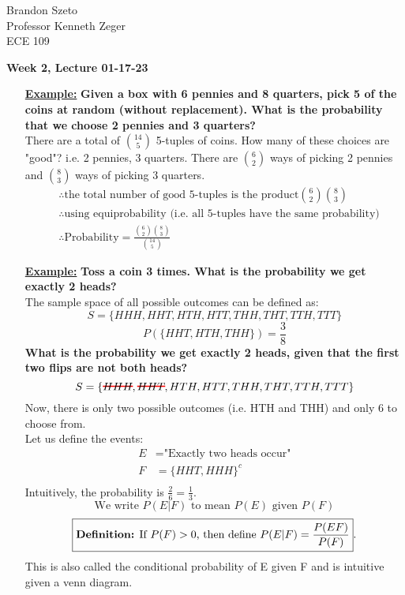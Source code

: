 \documentclass[10pt]{article}
\newcommand\hcancel[2][black]{\setbox0=\hbox{$#2$}%
\rlap{\raisebox{.45\ht0}{\textcolor{#1}{\rule{\wd0}{1pt}}}}#2}
\begin{document}
\begin{flushleft}
    Brandon Szeto \\
    Professor Kenneth Zeger \\
	ECE 109 \\
\end{flushleft}

\begin{center}
	\Large \textbf{Week 2, Lecture 01-17-23}
\end{center}
\normalsize

\begin{itemize}
    \item[\textbf{\underline{Example:}}] \textbf{Given a box with 6 pennies and 8 quarters, pick
        5 of the coins at random (without replacement). What is the probability
    that we choose 2 pennies and 3 quarters?} \\
    There are a total of $\binom{14}{5}$ 5-tuples of coins. How many of these
    choices are "good"? i.e. 2 pennies, 3 quarters. There are $\binom{6}{2}$
    ways of picking 2 pennies and $\binom{8}{3}$ ways of picking 3 quarters.
    $$\begin{aligned}
        &\therefore \text{the total number of good 5-tuples is the product} \binom{6}{2}
    \binom{8}{3} \\
        &\therefore \text{using equiprobability (i.e. all 5-tuples have the same
    probability)} \\
        &\therefore \text{Probability} = \frac{\binom{6}{2}\binom{8}{3}}{\binom{14}{5}}
\end{aligned}$$
    \item[\textbf{\underline{Example:}}] \textbf{Toss a coin 3 times. What is
        the probability we get exactly 2 heads?} \\
        The sample space of all possible outcomes can be defined as:
        $$ S = \{HHH, HHT, HTH, HTT, THH, THT, TTH, TTT\}$$
        $$ P(\{ HHT, HTH, THH \}) = \frac{3}{8}$$
        \textbf{What is the probability we get
        exactly 2 heads, given that the first two flips are not both heads?}
        $$ S = \{\hcancel[red]{HHH}, \hcancel[red]{HHT}, HTH, HTT, THH, THT, TTH, TTT\}$$
        Now, there is only two possible outcomes (i.e. HTH and THH) and only 6
        to choose from. \\
        Let us define the events:
        $$ \begin{aligned}
            E &= \text{"Exactly two heads occur"}\\
            F &= \{HHT, HHH\}^c\\
        \end{aligned} $$
        Intuitively, the probability is $\frac{2}{6} = \frac{1}{3}$.
        $$\boxed{ \text{We write } P(E | F) \text{ to mean } P(E) \text{ given }
        P(F) }$$
        $$\boxed{ \text{\textbf{Definition:} If } P(F) > 0 \text{, then define }
        P(E | F) = \frac{P(EF)}{P(F)}}. $$
        This is also called the conditional probability of E given F and is
        intuitive given a venn diagram.


\end{itemize}
\end{document}
